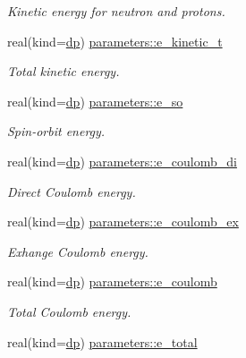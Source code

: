 \begin{DoxyCompactItemize}
\begin{DoxyCompactList}\small\item\em Kinetic energy for neutron and protons. \end{DoxyCompactList}\item 
real(kind=\mbox{\hyperlink{namespaceparameters_a52f8c6351fd79345d8811e065bcbbb37}{dp}}) \mbox{\hyperlink{group__WS__PROPERTIES_ga6a028c7097c7f19416111f67d7751e0a}{parameters\+::e\+\_\+kinetic\+\_\+t}}
\begin{DoxyCompactList}\small\item\em Total kinetic energy. \end{DoxyCompactList}\item 
real(kind=\mbox{\hyperlink{namespaceparameters_a52f8c6351fd79345d8811e065bcbbb37}{dp}}) \mbox{\hyperlink{group__WS__PROPERTIES_ga1be7ac7adf47738e0cf4ada759e3b038}{parameters\+::e\+\_\+so}}
\begin{DoxyCompactList}\small\item\em Spin-\/orbit energy. \end{DoxyCompactList}\item 
real(kind=\mbox{\hyperlink{namespaceparameters_a52f8c6351fd79345d8811e065bcbbb37}{dp}}) \mbox{\hyperlink{group__WS__PROPERTIES_gad3cbae007568a7ca3045ba174fda13e0}{parameters\+::e\+\_\+coulomb\+\_\+di}}
\begin{DoxyCompactList}\small\item\em Direct Coulomb energy. \end{DoxyCompactList}\item 
real(kind=\mbox{\hyperlink{namespaceparameters_a52f8c6351fd79345d8811e065bcbbb37}{dp}}) \mbox{\hyperlink{group__WS__PROPERTIES_ga089d9dd6556d4555570eed570f9f71f3}{parameters\+::e\+\_\+coulomb\+\_\+ex}}
\begin{DoxyCompactList}\small\item\em Exhange Coulomb energy. \end{DoxyCompactList}\item 
real(kind=\mbox{\hyperlink{namespaceparameters_a52f8c6351fd79345d8811e065bcbbb37}{dp}}) \mbox{\hyperlink{group__WS__PROPERTIES_gaa693f79a53c67f65948484a0d2704154}{parameters\+::e\+\_\+coulomb}}
\begin{DoxyCompactList}\small\item\em Total Coulomb energy. \end{DoxyCompactList}\item 
real(kind=\mbox{\hyperlink{namespaceparameters_a52f8c6351fd79345d8811e065bcbbb37}{dp}}) \mbox{\hyperlink{group__WS__PROPERTIES_ga041ce78d1803675af0825ead4e0a512e}{parameters\+::e\+\_\+total}}

\end{DoxyCompactItemize}
